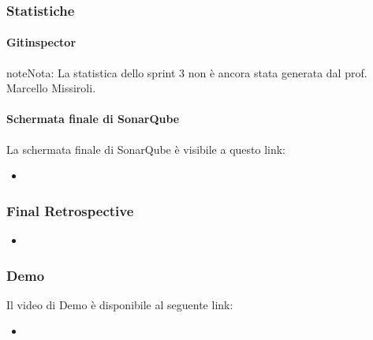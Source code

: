 \documentclass[letterpaper,10pt,italian]{sphinxmanual}
\begin{document}
\subsubsection{Statistiche}
\label{\detokenize{development/sprint3/index:statistiche}}

\paragraph{Gitinspector}
\label{\detokenize{development/sprint3/index:gitinspector}}
\begin{sphinxadmonition}{note}{Nota:}
\sphinxAtStartPar
La statistica dello sprint 3 non è ancora stata generata dal prof. Marcello Missiroli.
\end{sphinxadmonition}


\paragraph{Schermata finale di SonarQube}
\label{\detokenize{development/sprint3/index:schermata-finale-di-sonarqube}}
\sphinxAtStartPar
La schermata finale di SonarQube è visibile a questo link:
\begin{itemize}
\item {} 
\sphinxAtStartPar
{}

\end{itemize}


\subsubsection{Final Retrospective}
\label{\detokenize{development/sprint3/index:final-retrospective}}\begin{itemize}
\item {} 
\sphinxAtStartPar
{}

\end{itemize}


\subsubsection{Demo}
\label{\detokenize{development/sprint3/index:demo}}
\sphinxAtStartPar
Il video di Demo è disponibile al seguente link:
\begin{itemize}
\item {} 
\sphinxAtStartPar
{}

\end{itemize}
\end{document}
